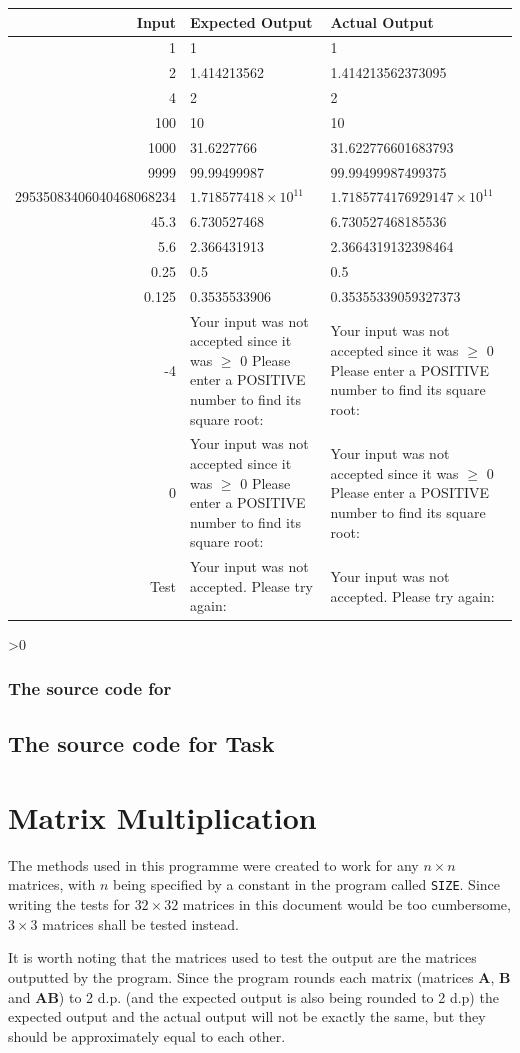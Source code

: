 \documentclass[12pt,a4paper,onesided]{report}
\newcommand{\source}{\pagebreak
	\ifnum\value{section}>0
		\subsection{The source code for \thesection}

	\else
		\section{The source code for Task \thechapter}

	\fi
	}
\begin{document}
\begin{table}[h!]
	\centering
	\begin{tabular}{rp{28ex}p{28ex}}
		\toprule
		Input & Expected Output & Actual Output\\\midrule
		1 & 1& 1\\
		2 &  1.414213562 & 1.414213562373095\\
		4 & 2 & 2\\ 
		100 & 10 & 10\\
		1000& 31.6227766 & 31.622776601683793\\
		9999& 99.99499987 & 99.99499987499375\\
	29535083406040468068234& $1.718577418\times10^{11}$&$1.7185774176929147\times10^{11}$\\
	45.3 & 6.730527468 & 6.730527468185536\\
	5.6 & 2.366431913 &2.3664319132398464\\
	0.25& 0.5 & 0.5\\
	0.125& 0.3535533906 & 0.35355339059327373\\
	-4& Your input was not accepted since it was $\geq$ 0 Please enter a POSITIVE number to find its square root:  & Your input was not accepted since it was $\geq$ 0 Please enter a POSITIVE number to find its square root:  \\
	0 & Your input was not accepted since it was $\geq$ 0 Please enter a POSITIVE number to find its square root: & Your input was not accepted since it was $\geq$ 0 Please enter a POSITIVE number to find its square root: \\
	Test& Your input was not accepted. Please try again: & Your input was not accepted. Please try again: \\
	\bottomrule
	\end{tabular}
\end{table}
\source

\chapter{Matrix Multiplication}
The methods used in this programme were created to work for any $n \times n$ matrices, with $n$ being specified by a constant in the program called \lstinline|SIZE|. Since writing the tests for $32\times32$ matrices in this document would be too cumbersome, $3\times3$ matrices shall be tested instead.

It is worth noting that the matrices used to test the output are the matrices outputted by the program. Since the program rounds each matrix (matrices $\mathbf{A}$, $\mathbf{B}$ and $\mathbf{AB}$) to 2 d.p. (and the expected output is also being rounded to 2 d.p) the expected output and the actual output will not be exactly the same, but they should be approximately equal to each other.
\end{document}
